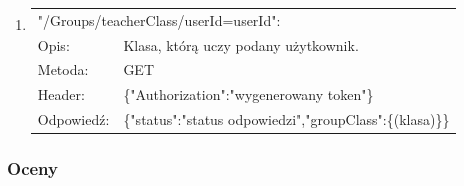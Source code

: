 \documentclass[12pt, titlepage]{article}
\begin{document}
\begin{enumerate}
	\item 
	{\renewcommand{\arraystretch}{1.5}
	\begin{tabular}[t]{p{3cm} p{15cm}}
	\multicolumn{2}{l}{"/Groups/teacherClass/userId={userId}":} \\
	Opis: &  Klasa, którą uczy podany użytkownik. \\
	Metoda: & GET \\
	Header: & \{"Authorization":"wygenerowany token"\} \\
	Odpowiedź: & \{"status":"status odpowiedzi",\newline "groupClass":\{(klasa)\}\}
	\end{tabular}}
\end{enumerate}

\subsubsection{Oceny}
\end{document}
